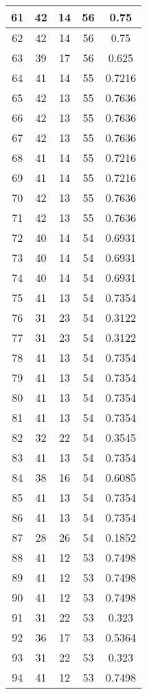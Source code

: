 \documentclass[letterpaper, 12pt]{article}
\begin{document}
\begin{longtable}{|c|c|c|c|c|}
\hline
61 & 42 & 14 & 56 & 0.75 \\
\hline
62 & 42 & 14 & 56 & 0.75 \\
\hline
63 & 39 & 17 & 56 & 0.625 \\
\hline
64 & 41 & 14 & 55 & 0.7216 \\
\hline
65 & 42 & 13 & 55 & 0.7636 \\
\hline
66 & 42 & 13 & 55 & 0.7636 \\
\hline
67 & 42 & 13 & 55 & 0.7636 \\
\hline
68 & 41 & 14 & 55 & 0.7216 \\
\hline
69 & 41 & 14 & 55 & 0.7216 \\
\hline
70 & 42 & 13 & 55 & 0.7636 \\
\hline
71 & 42 & 13 & 55 & 0.7636 \\
\hline
72 & 40 & 14 & 54 & 0.6931 \\
\hline
73 & 40 & 14 & 54 & 0.6931 \\
\hline
74 & 40 & 14 & 54 & 0.6931 \\
\hline
75 & 41 & 13 & 54 & 0.7354 \\
\hline
76 & 31 & 23 & 54 & 0.3122 \\
\hline
77 & 31 & 23 & 54 & 0.3122 \\
\hline
78 & 41 & 13 & 54 & 0.7354 \\
\hline
79 & 41 & 13 & 54 & 0.7354 \\
\hline
80 & 41 & 13 & 54 & 0.7354 \\
\hline
81 & 41 & 13 & 54 & 0.7354 \\
\hline
82 & 32 & 22 & 54 & 0.3545 \\
\hline
83 & 41 & 13 & 54 & 0.7354 \\
\hline
84 & 38 & 16 & 54 & 0.6085 \\
\hline
85 & 41 & 13 & 54 & 0.7354 \\
\hline
86 & 41 & 13 & 54 & 0.7354 \\
\hline
87 & 28 & 26 & 54 & 0.1852 \\
\hline
88 & 41 & 12 & 53 & 0.7498 \\
\hline
89 & 41 & 12 & 53 & 0.7498 \\
\hline
90 & 41 & 12 & 53 & 0.7498 \\
\hline
91 & 31 & 22 & 53 & 0.323 \\
\hline
92 & 36 & 17 & 53 & 0.5364 \\
\hline
93 & 31 & 22 & 53 & 0.323 \\
\hline
94 & 41 & 12 & 53 & 0.7498 \\

\end{longtable}
\end{document}
